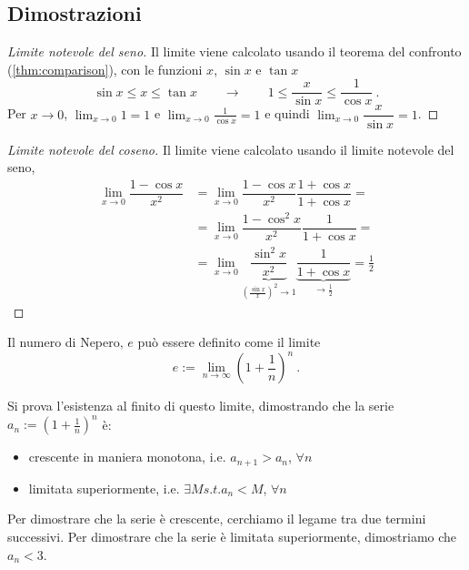 \subsection{Dimostrazioni}
\begin{proof}[Limite notevole del seno] Il limite viene calcolato usando il teorema del confronto (\ref{thm:comparison}), con le funzioni $x$, $\sin x$ e $\tan x$
    \begin{equation}
        \sin x \le x \le \tan x \qquad \rightarrow \qquad 1 \le \dfrac{x}{\sin{x}} \le \dfrac{1}{\cos x} \ .
    \end{equation}
    Per $x \rightarrow 0$, $\displaystyle\lim_{x \rightarrow 0} 1 = 1$ e $\displaystyle\lim_{x \rightarrow 0} \frac{1}{\cos x} = 1$ e quindi $ \lim_{x \rightarrow 0} \dfrac{ x }{\sin x} = 1 $.
\end{proof}
\begin{proof}[Limite notevole del coseno] Il limite viene calcolato usando il limite notevole del seno,
    \begin{equation}
        \begin{aligned}
            \lim_{x \rightarrow 0} \dfrac{1 - \cos x}{x^2} 
            & = \lim_{x \rightarrow 0} \dfrac{1 - \cos x}{x^2} \dfrac{1+\cos x}{1+\cos x} = \\
            & = \lim_{x \rightarrow 0} \dfrac{1 - \cos^2 x}{x^2} \dfrac{1}{1+\cos x} = \\ 
            & = \lim_{x \rightarrow 0} \underbrace{\dfrac{\sin^2 x}{x^2}}_{\left( \frac{\sin x}{x} \right)^2 \rightarrow 1} \underbrace{\dfrac{1}{1+\cos x}}_{\rightarrow \frac{1}{2}} = \frac{1}{2}
        \end{aligned}
    \end{equation}
\end{proof}
\begin{definition} Il numero di Nepero, $e$ può essere definito come il limite
    \begin{equation}
        e := \lim_{n \rightarrow \infty} \left( 1 + \dfrac{1}{n} \right)^n \ .
    \end{equation}
\end{definition}
Si prova l'esistenza al finito di questo limite, dimostrando che la serie $a_n := \left( 1 + \frac{1}{n} \right)^n $ è:
\begin{itemize}
    \item crescente in maniera monotona, i.e. $a_{n+1} > a_n$, $\forall n$
    \item limitata superiormente, i.e. $\exists M s.t. a_n < M$, $\forall n$
\end{itemize}
Per dimostrare che la serie è crescente, cerchiamo il legame tra due termini successivi.
Per dimostrare che la serie è limitata superiormente, dimostriamo che $a_n < 3$.

